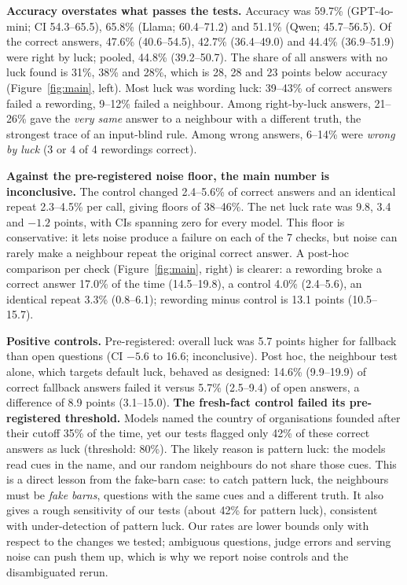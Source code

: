 \documentclass[10pt]{article}
\begin{document}
\textbf{Accuracy overstates what passes the tests.} Accuracy was 59.7\% (GPT-4o-mini; CI 54.3--65.5), 65.8\% (Llama; 60.4--71.2) and 51.1\% (Qwen; 45.7--56.5). Of the correct answers, 47.6\% (40.6--54.5), 42.7\% (36.4--49.0) and 44.4\% (36.9--51.9) were right by luck; pooled, 44.8\% (39.2--50.7). The share of all answers with no luck found is 31\%, 38\% and 28\%, which is 28, 28 and 23 points below accuracy (Figure~\ref{fig:main}, left). Most luck was wording luck: 39--43\% of correct answers failed a rewording, 9--12\% failed a neighbour. Among right-by-luck answers, 21--26\% gave the \emph{very same} answer to a neighbour with a different truth, the strongest trace of an input-blind rule. Among wrong answers, 6--14\% were \emph{wrong by luck} (3 or 4 of 4 rewordings correct).

\textbf{Against the pre-registered noise floor, the main number is inconclusive.} The control changed 2.4--5.6\% of correct answers and an identical repeat 2.3--4.5\% per call, giving floors of 38--46\%. The net luck rate was 9.8, 3.4 and $-1.2$ points, with CIs spanning zero for every model. This floor is conservative: it lets noise produce a failure on each of the 7 checks, but noise can rarely make a neighbour repeat the original correct answer. A post-hoc comparison per check (Figure~\ref{fig:main}, right) is clearer: a rewording broke a correct answer 17.0\% of the time (14.5--19.8), a control 4.0\% (2.4--5.6), an identical repeat 3.3\% (0.8--6.1); rewording minus control is 13.1 points (10.5--15.7).

\textbf{Positive controls.} Pre-registered: overall luck was 5.7 points higher for fallback than open questions (CI $-5.6$ to 16.6; inconclusive). Post hoc, the neighbour test alone, which targets default luck, behaved as designed: 14.6\% (9.9--19.9) of correct fallback answers failed it versus 5.7\% (2.5--9.4) of open answers, a difference of 8.9 points (3.1--15.0). \textbf{The fresh-fact control failed its pre-registered threshold.} Models named the country of organisations founded after their cutoff 35\% of the time, yet our tests flagged only 42\% of these correct answers as luck (threshold: 80\%). The likely reason is pattern luck: the models read cues in the name, and our random neighbours do not share those cues. This is a direct lesson from the fake-barn case: to catch pattern luck, the neighbours must be \emph{fake barns}, questions with the same cues and a different truth. It also gives a rough sensitivity of our tests (about 42\% for pattern luck), consistent with under-detection of pattern luck. Our rates are lower bounds only with respect to the changes we tested; ambiguous questions, judge errors and serving noise can push them up, which is why we report noise controls and the disambiguated rerun.
\end{document}
